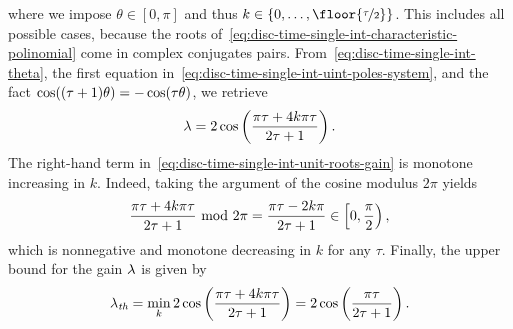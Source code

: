 where we impose $ \theta \in [0,\pi] $
and thus $ k\in\{0,\dots,\floor{\nicefrac{\delayn}{2}}\} $.
This includes all possible cases,
because the roots of~\eqref{eq:disc-time-single-int-characteristic-polinomial} come in complex conjugates pairs.
From~\eqref{eq:disc-time-single-int-theta},
the first equation in~\eqref{eq:disc-time-single-int-uint-poles-system},
and the fact $ \cos((\tau+1)\theta) = - \cos(\tau\theta) $,
we retrieve
\begin{equation}\label{eq:disc-time-single-int-unit-roots-gain}
	\lambda = 2\cos\left(\dfrac{\pi\tau+4k\pi\tau}{2\tau+1}\right).
\end{equation}
The right-hand term in~\eqref{eq:disc-time-single-int-unit-roots-gain} is monotone increasing in $ k $.
Indeed, taking the argument of the cosine modulus $ 2\pi $ yields
\begin{equation}\label{eq:disc-time-single-int-angle-modulus}
	\dfrac{\pi\tau+4k\pi\tau}{2\tau+1} \ \mathrm{ mod} \ 2\pi = \dfrac{\pi\tau-2k\pi}{2\tau+1} \in \left[0,\dfrac{\pi}{2}\right),
\end{equation}
which is nonnegative and monotone decreasing in $ k $ for any $ \tau $.
Finally, the upper bound for the gain $ \lambda $ is given by
\begin{equation}\label{eq:disc-time-single-int-threshold-gain}
	\lambda_{\textit{th}} = \min_k2\cos\left(\dfrac{\pi\tau+4k\pi\tau}{2\tau+1}\right) = 2\cos\left(\dfrac{\pi\tau}{2\tau+1}\right).
\end{equation}


